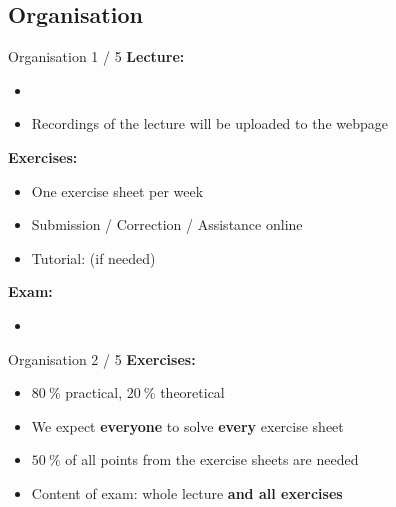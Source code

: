 \subsection{Organisation}

\begin{frame}{Organisation 1 / 5}
  \textbf{Lecture:}
  \begin{itemize}
    \item
      {\color{MainB}\LectureOrganisationLecture}
    \item
      Recordings of the lecture will be uploaded to the webpage
  \end{itemize}
  \textbf{Exercises:}
  \begin{itemize}
    \item
      One exercise sheet per week
    \item
      Submission / Correction / Assistance online
    \item
      Tutorial: (if needed)\\
      {\color{MainB}\LectureOrganisationHelp}
  \end{itemize}
  \textbf{Exam:}\\
  \begin{itemize}
    \item
      {\color{MainB}\LectureOrganisationExam}
  \end{itemize}
\end{frame}


\begin{frame}{Organisation 2 / 5}
  \textbf{Exercises:}
  \begin{itemize}
    \item
      {\color{MainA}$\SI{80}{\percent}$} practical,
      {\color{MainA}$\SI{20}{\percent}$} theoretical
    \item<2- |handout:1>
      We expect \textbf{everyone} to solve \textbf{every} exercise sheet
  \end{itemize}
  \begin{itemize}
    \item<4- |handout:1>
      {\color{MainA}$\SI{50}{\percent}$} of all points from
      the exercise sheets are needed
    \item<5- |handout:1>
      Content of exam: whole lecture \textbf{and all exercises}
  \end{itemize}
\end{frame}

